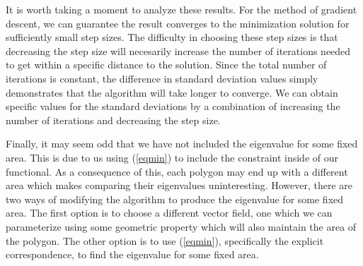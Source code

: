 \documentclass[12pt]{report}
\numberwithin{definition}{section}
\begin{document}
It is worth taking a moment to analyze these results.
For the method of gradient descent, we can guarantee the result converges to the minimization solution for sufficiently small step sizes\cite{curry}.
The difficulty in choosing these step sizes is that decreasing the step size will necesarily increase the number of iterations needed to get within a specific distance to the solution.
Since the total number of iterations is constant, the difference in standard deviation values simply demonstrates that the algorithm will take longer to converge. 
We can obtain specific values for the standard deviations by a combination of increasing the number of iterations and decreasing the step size.

Finally, it may seem odd that we have not included the eigenvalue for some fixed area.
This is due to us using (\ref{eqmin}) to include the constraint inside of our functional.
As a consequence of this, each polygon may end up with a different area which makes comparing their eigenvalues uninteresting.
However, there are two ways of modifying the algorithm to produce the eigenvalue for some fixed area.
The first option is to choose a different vector field, one which we can parameterize using some geometric property which will also maintain the area of the polygon.
The other option is to use (\ref{eqmin}), specifically the explicit correspondence, to find the eigenvalue for some fixed area.





\break

 
 
\printbibliography
 
\end{document}
